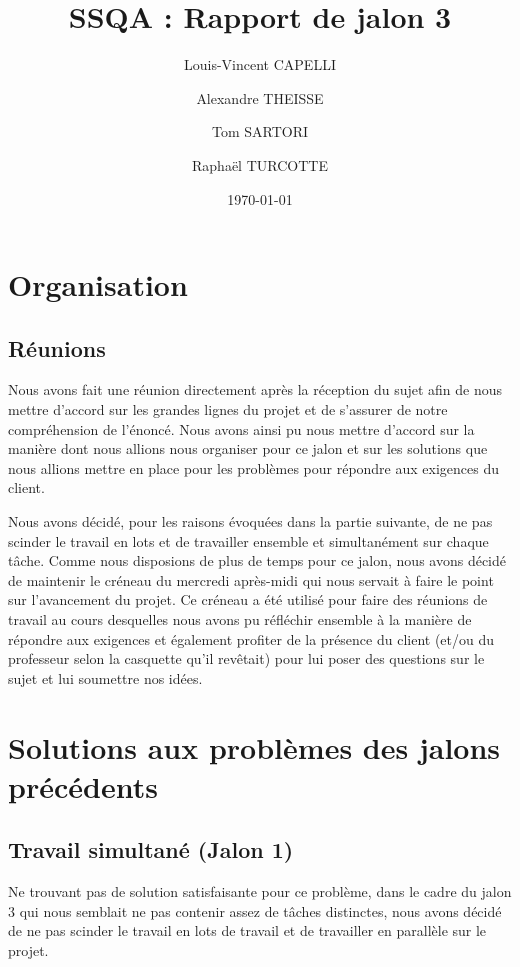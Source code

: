 \documentclass{report}
\begin{document}
\title{SSQA : Rapport de jalon 3}

\author{Louis-Vincent CAPELLI \and Alexandre THEISSE \and Tom SARTORI \and Raphaël TURCOTTE}
\date{\today}
\maketitle

\chapter{Organisation}
\section{Réunions}
Nous avons fait une réunion directement après la réception du sujet afin de nous mettre
d'accord sur les grandes lignes du projet et de s'assurer de notre compréhension de l'énoncé.
Nous avons ainsi pu nous mettre d'accord sur la manière dont nous allions nous organiser
pour ce jalon et sur les solutions que nous allions mettre en place pour les problèmes pour
répondre aux exigences du client.

Nous avons décidé, pour les raisons évoquées dans la partie suivante, de ne pas scinder
le travail en lots et de travailler ensemble et simultanément sur chaque tâche.
Comme nous disposions de plus de temps pour ce jalon, nous avons décidé de maintenir le
créneau du mercredi après-midi qui nous servait à faire le point sur l'avancement du projet.
Ce créneau a été utilisé pour faire des réunions de travail au cours desquelles nous avons
pu réfléchir ensemble à la manière de répondre aux exigences et également profiter de la
présence du client (et/ou du professeur selon la casquette qu'il revêtait) pour lui poser des
questions sur le sujet et lui soumettre nos idées.


\chapter{Solutions aux problèmes des jalons précédents}

\section{Travail simultané (Jalon 1)}
Ne trouvant pas de solution satisfaisante pour ce problème, dans le cadre du jalon 3 qui
nous semblait ne pas contenir assez de tâches distinctes, nous avons décidé de ne pas scinder
le travail en lots de travail et de travailler en parallèle sur le projet.
\end{document}
